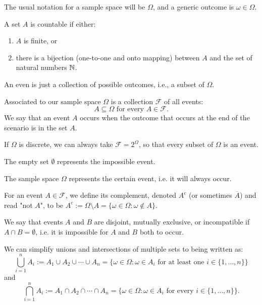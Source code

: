 \documentclass[10pt, a4paper]{article}
\begin{document}
The usual notation for a sample space will be $\Omega$, and a generic outcome is $\omega \in \Omega$.

\begin{definition}
    A set $A$ is countable if either:
    \begin{enumerate}[label = (\roman*)]
        \item $A$ is finite, or
        \item there is a bijection (one-to-one and onto mapping) between $A$ and the set of natural numbers $\mathbb{N}$.
    \end{enumerate}
\end{definition}

An even is just a collection of possible outcomes, i.e., a subset of $\Omega$.

\begin{definition}[Events]
    Associated to our sample space $\Omega$ is a collection $\mathcal{F}$ of all events:
    \[
    A \subseteq \Omega \text{ for every } A \in \mathcal{F}.
    \]
    We say that an event $A$ occurs when the outcome that occurs at the end of the scenario is in the set $A$.
\end{definition}

If $\Omega$ is discrete, we can always take $\mathcal{F} = 2 ^ \Omega$, so that every subset of $\Omega$ is an event.

The empty set $\emptyset$ represents the impossible event.

The sample space $\Omega$ represents the certain event, i.e. it will always occur.

\begin{definition}[Complement]
    For an event $A \in \mathcal{F}$, we define its complement, denoted $A ^ c$ (or sometimes $\overline{A}$) and read "not $A$", to be $A ^ c := \Omega \setminus A = \{\omega \in \Omega : \omega \notin A\}$.
\end{definition}

\begin{definition}[Disjoint]
    We say that events $A$ and $B$ are disjoint, mutually exclusive, or incompatible if $A \cap B = \emptyset$, i.e. it is impossible for $A$ and $B$ both to occur.
\end{definition}

We can simplify unions and intersections of multiple sets to being written as:
\[
\bigcup_{i = 1}^{n}{A_i} := A_1 \cup A_2 \cup \dotsi \cup A_n = \{\omega \in \Omega : \omega \in A_i \text{ for at least one } i \in \{1,\dots, n\}\}
\]
and
\[
\bigcap_{i = 1}^{n}{A_i} := A_1 \cap A_2 \cap \dotsi \cap A_n = \{\omega \in \Omega : \omega \in A_i \text{ for every } i \in \{1,\dots, n\}\}.
\]
\end{document}
